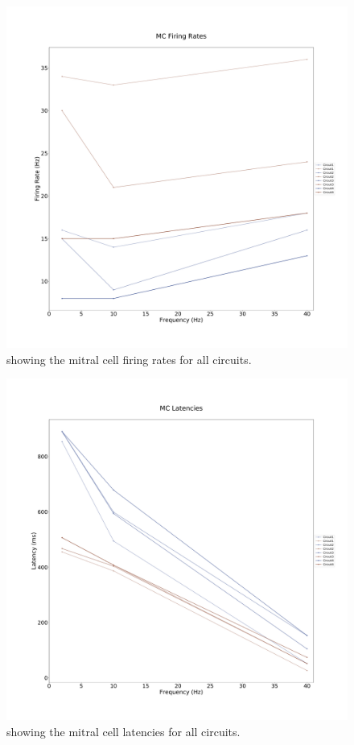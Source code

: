 \documentclass[11pt]{report}
\begin{document}
\begin{figure}[!ht]
\centering
\includegraphics[scale=0.3]{images/2017-11-06/MC_firing_rate.pdf}
\caption{showing the mitral cell firing rates for all circuits.}
\end{figure} 

\begin{figure}[!ht]
\centering
\includegraphics[scale=0.3]{images/2017-11-06/MC_latencies.pdf}
\caption{showing the mitral cell latencies for all circuits.}
\end{figure}
\end{document}
